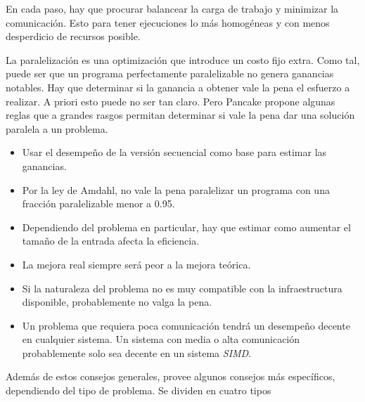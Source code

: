 En cada paso, hay que procurar balancear la carga de trabajo y minimizar la
comunicación. Esto para tener ejecuciones lo más homogéneas y con menos
desperdicio de recursos posible.

La paralelización es una optimización que introduce un costo fijo extra. Como
tal, puede ser que un programa perfectamente paralelizable no genera ganancias
notables. Hay que determinar si la ganancia a obtener vale la pena el esfuerzo
a realizar. A priori esto puede no ser tan claro. Pero Pancake
\cite{Pancake1996} propone algunas reglas que a grandes rasgos permitan
determinar si vale la pena dar una solución paralela a un problema.

\begin{itemize}
\item Usar el desempeño de la versión secuencial como base para estimar las
  ganancias.

\item Por la ley de Amdahl, no vale la pena paralelizar un programa con una
  fracción paralelizable menor a 0.95.

\item Dependiendo del problema en particular, hay que estimar como aumentar
  el tamaño de la entrada afecta la eficiencia.

\item La mejora real siempre será peor a la mejora teórica.

\item Si la naturaleza del problema no es muy compatible con la infraestructura
  disponible, probablemente no valga la pena.

\item Un problema que requiera poca comunicación tendrá un desempeño decente en
  cualquier sistema. Un sistema con media o alta comunicación probablemente
  solo sea decente en un sistema \emph{SIMD}.

\end{itemize}

Además de estos consejos generales, provee algunos consejos más específicos,
dependiendo del tipo de problema. Se dividen en cuatro tipos

